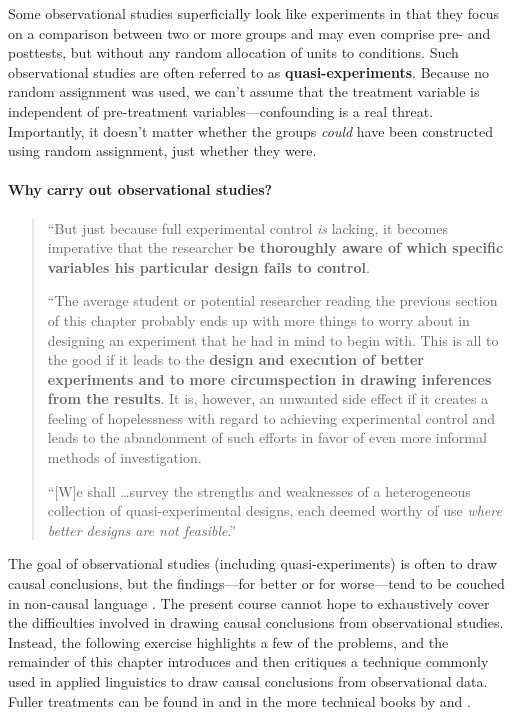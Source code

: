 \documentclass[a4paper]{tufte-book}\usepackage[]{graphicx}\usepackage[]{xcolor}
\newcommand{\term}[1]{\textbf{#1}}
\begin{document}
Some observational studies superficially look like experiments
in that they focus on a comparison between two or more groups
and may even comprise pre- and posttests, but without any random allocation
of units to conditions.
Such observational studies are often referred to as \term{quasi-experiments}.
Because no random assignment was used,
we can't assume that the treatment variable is independent of
pre-treatment variables---confounding is a real threat.
Importantly, it doesn't matter whether the groups \emph{could} have
been constructed using random assignment, just whether they were.

\paragraph{Why carry out observational studies?}
 \begin{quote}
``But just because full experimental control \emph{is} lacking, it becomes imperative that the researcher
\textbf{be thoroughly aware of which specific variables his particular design fails to control}.

``The average student or potential researcher reading the previous section of this chapter probably ends up with more things to worry about in designing an experiment that he had in mind to begin with.
This is all to the good if it leads to the \textbf{design and execution of better experiments and to more
circumspection in drawing inferences from the results}.
It is, however, an unwanted side effect if it creates a feeling of hopelessness with regard to achieving
experimental control and leads to the abandonment of such efforts in favor
of even more informal methods of investigation.

``[W]e shall \dots survey the strengths and weaknesses of a heterogeneous collection of quasi-experimental designs, each deemed worthy of use \emph{where better designs are not feasible}.'' \citep[p.~34; their emphasis in italics, mine in bold-face]{Campbell1963}
\end{quote}

The goal of observational studies (including quasi-experiments)
is often to draw causal conclusions, but the findings---for better
or for worse---tend to be couched in non-causal language \citep{Grosz2020}.
The present course cannot hope to exhaustively cover the difficulties involved
in drawing causal conclusions from observational studies.
Instead, the following exercise highlights a few of the problems,
and the remainder of this chapter introduces and then critiques a technique
commonly used in applied linguistics to draw causal conclusions from
observational data.
Fuller treatments can be found in \citet{Campbell1963} and in the more
technical books by \citet{Imbens2015} and \citet{Ding2024}.
\end{document}
